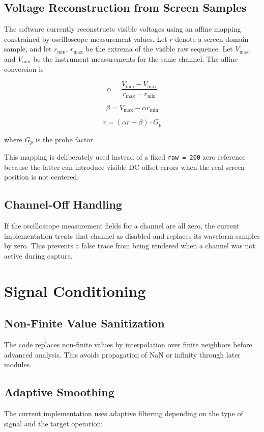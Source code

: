 \documentclass[conference]{IEEEtran}
\begin{document}
\subsection{Voltage Reconstruction from Screen Samples}
The software currently reconstructs visible voltages using an affine mapping constrained by oscilloscope measurement values. Let $r$ denote a screen-domain sample, and let $r_{\min}$, $r_{\max}$ be the extrema of the visible raw sequence. Let $V_{\max}$ and $V_{\min}$ be the instrument measurements for the same channel. The affine conversion is

\begin{equation}
\alpha = \frac{V_{\min} - V_{\max}}{r_{\max} - r_{\min}}
\end{equation}

\begin{equation}
\beta = V_{\max} - \alpha r_{\min}
\end{equation}

\begin{equation}
v = (\alpha r + \beta)\cdot G_p
\end{equation}

where $G_p$ is the probe factor.

This mapping is deliberately used instead of a fixed \texttt{raw = 200} zero reference because the latter can introduce visible DC offset errors when the real screen position is not centered.

\subsection{Channel-Off Handling}
If the oscilloscope measurement fields for a channel are all zero, the current implementation treats that channel as disabled and replaces its waveform samples by zero. This prevents a false trace from being rendered when a channel was not active during capture.

\section{Signal Conditioning}
\subsection{Non-Finite Value Sanitization}
The code replaces non-finite values by interpolation over finite neighbors before advanced analysis. This avoids propagation of NaN or infinity through later modules.

\subsection{Adaptive Smoothing}
The current implementation uses adaptive filtering depending on the type of signal and the target operation:
\end{document}
